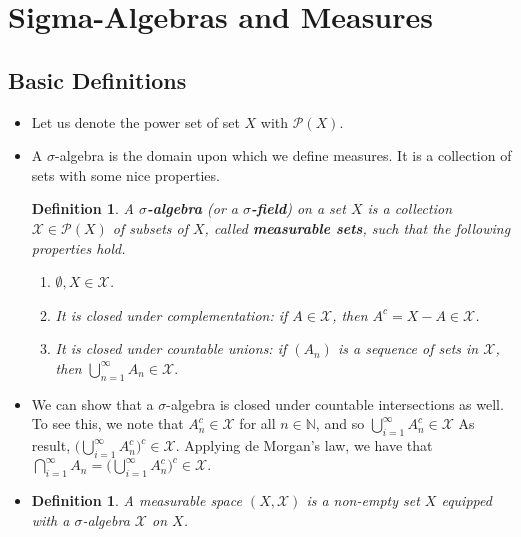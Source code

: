 \documentclass[10pt]{article}
\newtheorem{definition}[lemma]{Definition}
\newcommand{\mcal}[1]{\mathcal{#1}}
\begin{document}
\section{Sigma-Algebras and Measures}

\subsection{Basic Definitions}

\begin{itemize}
  \item Let us denote the power set of set $X$ with $\mcal{P}(X)$.
  
  \item A $\sigma$-algebra is the domain upon which we define measures. It is a collection of sets with some nice properties.
  
  \begin{definition}    
    A {\bf $\sigma$-algebra} (or a {\bf $\sigma$-field}) on a set $X$ is a collection $\mcal{X} \in \mcal{P}(X)$ of subsets of $X$, called {\bf measurable sets}, such that the following properties hold.
    \begin{enumerate}
      \item $\emptyset, X \in \mcal{X}$.
      \item It is closed under complementation: if $A \in \mcal{X}$, then $A^c = X - A \in \mcal{X}$.
      \item It is closed under countable unions: if $(A_n)$ is a sequence of sets in $\mcal{X}$, then $\bigcup_{n=1}^\infty A_n \in \mcal{X}.$
    \end{enumerate}
  \end{definition}

  \item We can show that a $\sigma$-algebra is closed under countable intersections as well. To see this, we note that $A_n^c \in \mcal{X}$ for all $n \in \mathbb{N}$, and so $\bigcup_{i=1}^\infty A_n^c \in \mcal{X}$  
  As result, $\big( \bigcup_{i=1}^\infty A_n^c \big)^c \in \mcal{X}.$
  Applying de Morgan's law, we have that
  $\bigcap_{i=1}^\infty A_n = \big( \bigcup_{i=1}^\infty A_n^c \big)^c  \in \mcal{X}.$  

  \item \begin{definition}
    A measurable space $(X, \mcal{X})$ is a non-empty set $X$ equipped with a $\sigma$-algebra $\mcal{X}$ on $X$.
  \end{definition}


\end{itemize}
\end{document}
